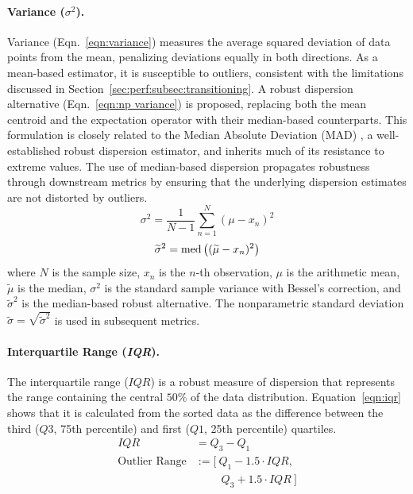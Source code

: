 \paragraph{Variance ($\sigma^2$).}
Variance (Eqn.~\ref{eqn:variance}) measures the average squared deviation of data points from the mean, penalizing deviations equally in both directions. As a mean-based estimator, it is susceptible to outliers, consistent with the limitations discussed in Section~\ref{sec:perf:subsec:transitioning}. A robust dispersion alternative (Eqn.~\ref{eqn:np variance}) is proposed, replacing both the mean centroid and the expectation operator with their median-based counterparts. This formulation is closely related to the Median Absolute Deviation (MAD) \cite{Rousseeuw1993}, a well-established robust dispersion estimator, and inherits much of its resistance to extreme values. The use of median-based dispersion propagates robustness through downstream metrics by ensuring that the underlying dispersion estimates are not distorted by outliers.
\begin{equation}\label{eqn:variance}
    \sigma^2 = \frac{1}{N-1} \sum_{n=1}^N \left( \mu - x_n \right)^2 
\end{equation}
\begin{equation}\label{eqn:np variance}
    \widetilde{\sigma}^2 = \textnormal{med} \left( (\widetilde{\mu} - x_n)^2  \right) 
\end{equation}
\noindent where $N$ is the sample size, $x_n$ is the $n$-th observation, $\mu$ is the arithmetic mean, $\widetilde{\mu}$ is the median, $\sigma^2$ is the standard sample variance with Bessel's correction, and $\widetilde{\sigma}^2$ is the median-based robust alternative. The nonparametric standard deviation $\widetilde{\sigma} = \sqrt{\widetilde{\sigma}^2}$ is used in subsequent metrics.

\paragraph{Interquartile Range (\textit{IQR}).}
The interquartile range ($IQR$) is a robust measure of dispersion that represents the range containing the central $50\%$ of the data distribution. Equation~\ref{eqn:iqr} shows that it is calculated from the sorted data as the difference between the third ($Q3$, 75th percentile) and first ($Q1$, 25th percentile) quartiles. %
\begin{subequations}\label{eqn:IQR}
    \begin{align}
        IQR &= Q_3 - Q_1 \label{eqn:iqr} \\[1ex]
        \text{Outlier Range} &:= [\ Q_1 - 1.5 \cdot IQR, \label{eqn:iqr_outlier} \\
        &\phantom{:= [}\ \ Q_3 + 1.5 \cdot IQR\ ] \nonumber
    \end{align}
\end{subequations}

